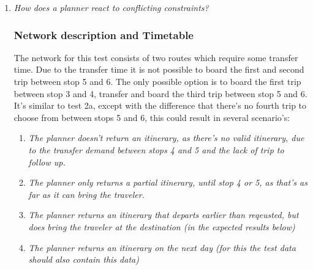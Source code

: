 \documentclass[a4paper,11pt]{article}
\begin{document}
\begin{enumerate}

\item \textit{How does a planner react to conflicting constraints?}
\subsubsection*{Network description and Timetable}

The network for this test consists of two routes which require some transfer time.
Due to the transfer time it is not possible to board the first and second trip between stop 5 and 6.
The only possible option is to board the first trip between stop 3 and 4, transfer and board the third trip between stop 5 and 6.
It's similar to test 2a, except with the difference that there's no fourth trip to choose from between stops 5 and 6, this could result in several scenario's:

\begin{enumerate}
\item \textit{The planner doesn't return an itinerary, as there's no valid itinerary, due to the transfer demand between stops 4 and 5 and the lack of trip to follow up.}
\item \textit{The planner only returns a partial itinerary, until stop 4 or 5, as that's as far as it can bring the traveler.}
\item \textit{The planner returns an itinerary that departs earlier than reqeusted, but does bring the traveler at the destination (in the expected results below)}
\item \textit{The planner returns an itinerary on the next day (for this the test data should also contain this data)}
\end{enumerate}

\begin{figure}[h]
\vspace{1em}
\raggedleft
\begin{minipage}{275pt}
\end{minipage}
\end{figure}
\end{enumerate}
\end{document}
